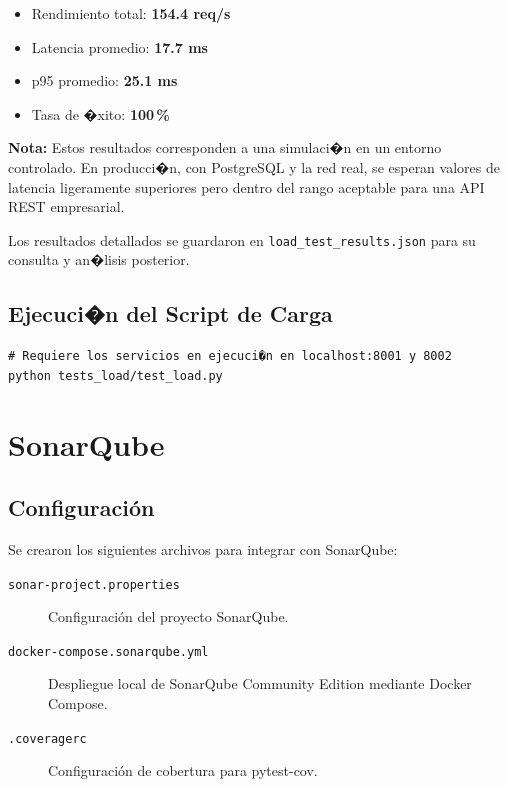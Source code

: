 \documentclass[12pt,a4paper]{article}
\begin{document}
\begin{itemize}
  \item Rendimiento total: \textbf{154.4 req/s}
  \item Latencia promedio: \textbf{17.7 ms}
  \item p95 promedio: \textbf{25.1 ms}
  \item Tasa de �xito: \textbf{100\,\%}
\end{itemize}

\vspace{0.3cm}
\textbf{Nota:} Estos resultados corresponden a una simulaci�n en un entorno
controlado. En producci�n, con PostgreSQL y la red real, se esperan valores
de latencia ligeramente superiores pero dentro del rango aceptable para una
API REST empresarial.

Los resultados detallados se guardaron en \texttt{load\_test\_results.json}
para su consulta y an�lisis posterior.

\subsection{Ejecuci�n del Script de Carga}
\vspace{0.3cm}
\begin{lstlisting}[style=bashstyle]
# Requiere los servicios en ejecuci�n en localhost:8001 y 8002
python tests_load/test_load.py
\end{lstlisting}

\section{SonarQube}

\subsection{Configuraci\'on}

Se crearon los siguientes archivos para integrar con SonarQube:

\begin{description}
  \item[\texttt{sonar-project.properties}] Configuraci\'on del proyecto SonarQube.
  \item[\texttt{docker-compose.sonarqube.yml}] Despliegue local de SonarQube
        Community Edition mediante Docker Compose.
  \item[\texttt{.coveragerc}] Configuraci\'on de cobertura para pytest-cov.
\end{description}
\end{document}
